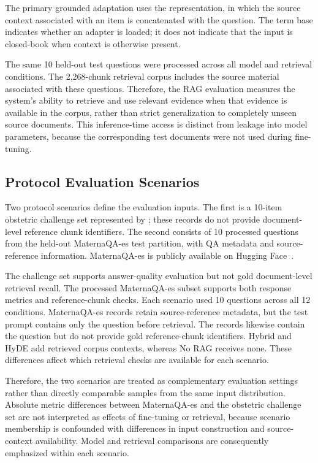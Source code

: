 The primary grounded adaptation uses the 
representation, in which the source context associated with an item is
concatenated with the question. The term base indicates whether an adapter is
loaded; it does not indicate that the input is closed-book when context is
otherwise present.

The same 10 held-out test questions were processed across all model and
retrieval conditions. The 2,268-chunk retrieval corpus includes the source
material associated with these questions. Therefore, the RAG evaluation
measures the system's ability to retrieve and use relevant evidence when
that evidence is available in the corpus, rather than strict generalization
to completely unseen source documents. This inference-time access is
distinct from leakage into model parameters, because the corresponding test
documents were not used during fine-tuning.

\subsection{Protocol Evaluation Scenarios}
Two protocol scenarios define the evaluation inputs. The first is a
10-item obstetric challenge set represented by ;
these records do not provide document-level reference chunk identifiers.
The second consists of 10 processed questions from the held-out MaternaQA-es
test partition, with QA metadata and source-reference information.
MaternaQA-es is publicly available on Hugging Face~\cite{maternaqa2026}.

The challenge set supports answer-quality evaluation but not gold
document-level retrieval recall. The processed MaternaQA-es subset supports
both response metrics and reference-chunk checks. Each scenario used 10 questions across all 12 conditions. MaternaQA-es
records retain source-reference metadata, but the test prompt contains only
the question before retrieval. The  records likewise contain
the question but do not provide gold reference-chunk identifiers. Hybrid and
HyDE add retrieved corpus contexts, whereas No RAG receives none. These
differences affect which retrieval checks are available for each scenario.

Therefore, the two scenarios are treated as complementary evaluation
settings rather than directly comparable samples from the same input
distribution. Absolute metric differences between MaternaQA-es and the
obstetric challenge set are not interpreted as effects of fine-tuning or
retrieval, because scenario membership is confounded with differences in
input construction and source-context availability. Model and retrieval
comparisons are consequently emphasized within each scenario.

